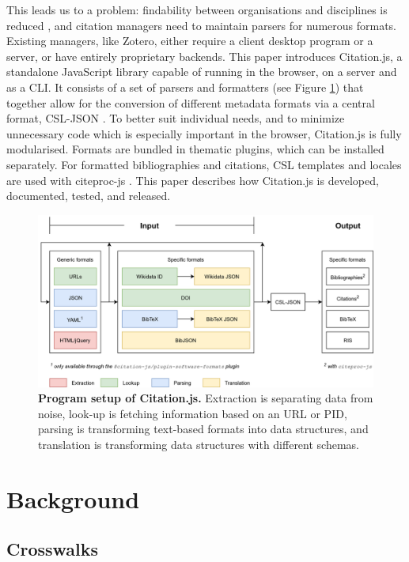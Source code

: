 \documentclass[fleqn,10pt,lineno]{wlpeerj} %
\begin{document}
This leads us to a problem: findability between organisations and disciplines is reduced \cite{godby_repository_2004,zinn_crosswalking_2016}, and citation managers need to maintain parsers for numerous formats. Existing managers, like Zotero, either require a client desktop program or a server, or have entirely proprietary backends. This paper introduces Citation.js, a standalone JavaScript library capable of running in the browser, on a server and as a CLI. It consists of a set of parsers and formatters (see Figure \ref{fig:structure}) that together allow for the conversion of different metadata formats via a central format, CSL-JSON \cite{Bennett2018Juris-M/citeproc-js}. To better suit individual needs, and to minimize unnecessary code which is especially important in the browser, Citation.js is fully modularised. Formats are bundled in thematic plugins, which can be installed separately. For formatted bibliographies and citations, CSL templates and locales are used with citeproc-js \citep{zelle_csl_2012,Bennett2018Juris-M/citeproc-js}. This paper describes how Citation.js is developed, documented, tested, and released.

\begin{figure}[bt]
\centering
\includegraphics[width=\linewidth]{figures/architecture.png}
\caption{\textbf{Program setup of Citation.js.} Extraction is separating data from noise, look-up is fetching information based on an URL or PID, parsing is transforming text-based formats into data structures, and translation is transforming data structures with different schemas.}
\label{fig:structure}
\end{figure}

\section*{Background}

\subsection*{Crosswalks}
\end{document}
